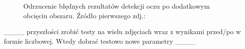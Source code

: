 \begin{figure}[!h]
    \begin{center}
        \hspace{8mm}
    \end{center}
    \caption{Odrzucenie błędnych rezultatów detekcji oczu po dodatkowym obcięciu obszaru. Źródło pierwszego zdj.:\cite{readheadPortrait2}}
    \label{fig:eye_detect_crop}
\end{figure}

{\_\_\_\_} przyszłości zrobić testy na wielu zdjęciach wraz z wynikami przed/po w formie liczbowej. Wtedy dobrać testowo nowe parametry {\_\_\_\_}

